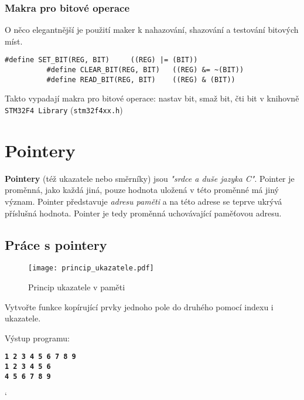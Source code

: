       \subsubsection{Makra pro bitové operace}
        O něco elegantnější je použití maker k nahazování, shazování a testování bitových míst. 
        \begin{lstlisting}[gobble=10, xrightmargin=13em]
          #define SET_BIT(REG, BIT)     ((REG) |= (BIT))
          #define CLEAR_BIT(REG, BIT)   ((REG) &= ~(BIT))
          #define READ_BIT(REG, BIT)    ((REG) & (BIT))
        \end{lstlisting}
       Takto vypadají makra pro bitové operace: nastav bit, smaž bit, čti bit v knihovně 
       \texttt{STM32F4 Library} (\texttt{stm32f4xx.h})
      
  \section{Pointery}
    \textbf{Pointery} (též ukazatele nebo směrníky) jsou \emph{"srdce a duše jazyka C"}. Pointer je 
    proměnná, jako každá jiná, pouze hodnota uložená v této proměnné má jiný význam. Pointer 
    představuje \textit{adresu paměti} a na této adrese se teprve ukrývá příslušná hodnota. Pointer 
    je tedy proměnná uchovávající paměťovou adresu.\cite{Herout}
  
    \subsection{Práce s pointery}
      \begin{figure}
        \centering
        \texttt{[image: princip\_ukazatele.pdf]}
        \caption{Princip ukazatele v paměti}
        \label{figure:pointer1}
      \end{figure}
      \begin{example}Vytvořte funkce kopírující prvky jednoho pole do druhého pomocí indexu i 
        ukazatele.
      
        \lstset{xrightmargin=13em}
        
       
       Výstup programu:%
       \begin{mdframed}[backgroundcolor=black, linecolor=white, %
                         fontcolor=white, userdefinedwidth=5cm, align=center, %
                         linecolor=gray, linewidth=3pt]
       \texttt{\textbf{1   2   3   4   5   6   7   8   9}} \\
       \texttt{\textbf{1   2   3   4   5   6}} \\
       \texttt{\textbf{4   5   6   7   8   9}}
       \end{mdframed} `
     \end{example}
